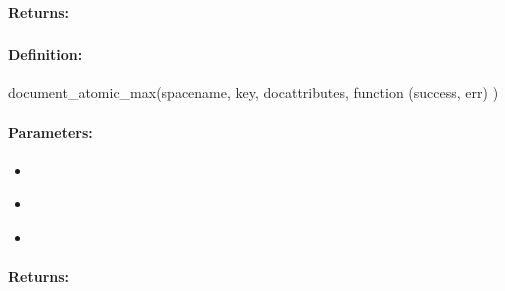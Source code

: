 \paragraph{Returns:}


\pagebreak
\subsubsection{}
\label{api:nodejs:document_atomic_max}


\paragraph{Definition:}
\begin{javascriptcode}
document_atomic_max(spacename, key, docattributes, function (success, err) {})
\end{javascriptcode}
\paragraph{Parameters:}
\begin{itemize}[noitemsep]
\item {}\\

\item {}\\

\item {}\\

\end{itemize}

\paragraph{Returns:}


\pagebreak
\subsubsection{}
\label{api:nodejs:document_string_prepend}


